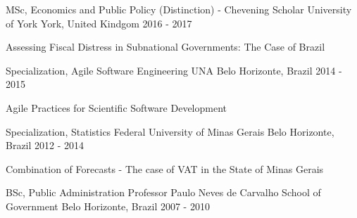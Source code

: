 \begin{cventries}
  \cventry
    {MSc, Economics and Public Policy (Distinction) - Chevening Scholar}
    {University of York}
    {York, United Kindgom}
    {2016 - 2017}
    {
      \begin{cvitems}
        \item {Assessing Fiscal Distress in Subnational Governments: The Case of Brazil}
      \end{cvitems}
    }
  \cventry
    {Specialization, Agile Software Engineering}
    {UNA}
    {Belo Horizonte, Brazil}
    {2014 - 2015}
    {
      \begin{cvitems}
        \item {Agile Practices for Scientific Software Development}
      \end{cvitems}
    }
  \cventry
    {Specialization, Statistics}
    {Federal University of Minas Gerais}
    {Belo Horizonte, Brazil}
    {2012 - 2014}
    {
      \begin{cvitems}
        \item {Combination of Forecasts - The case of VAT in the State of Minas Gerais}
      \end{cvitems}
    }
  \cventry
    {BSc, Public Administration}
    {Professor Paulo Neves de Carvalho School of Government}
    {Belo Horizonte, Brazil}
    {2007 - 2010}
    {
      \begin{cvitems}
      \end{cvitems}
    }
\end{cventries}
